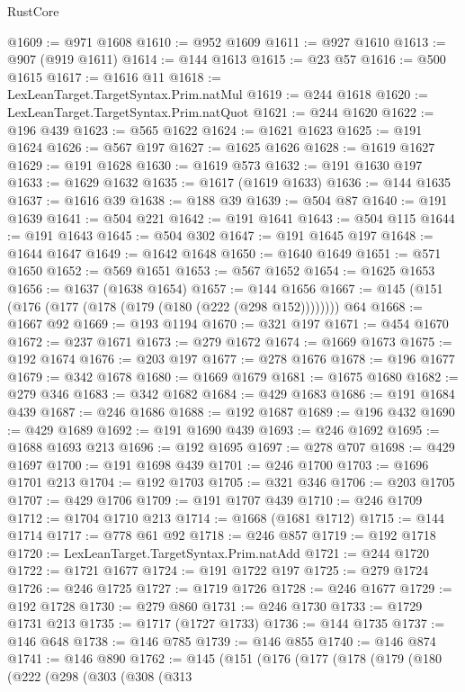 \begin{lexlean}{RustCore}
\begin{coremodule}
@1609 := @971 @1608
@1610 := @952 @1609
@1611 := @927 @1610
@1613 := @907 (@919 @1611)
@1614 := @144 @1613
@1615 := @23 @57
@1616 := @500 @1615
@1617 := @1616 @11
@1618 := LexLeanTarget.TargetSyntax.Prim.natMul
@1619 := @244 @1618
@1620 := LexLeanTarget.TargetSyntax.Prim.natQuot
@1621 := @244 @1620
@1622 := @196 @439
@1623 := @565 @1622
@1624 := @1621 @1623
@1625 := @191 @1624
@1626 := @567 @197
@1627 := @1625 @1626
@1628 := @1619 @1627
@1629 := @191 @1628
@1630 := @1619 @573
@1632 := @191 @1630 @197
@1633 := @1629 @1632
@1635 := @1617 (@1619 @1633)
@1636 := @144 @1635
@1637 := @1616 @39
@1638 := @188 @39
@1639 := @504 @87
@1640 := @191 @1639
@1641 := @504 @221
@1642 := @191 @1641
@1643 := @504 @115
@1644 := @191 @1643
@1645 := @504 @302
@1647 := @191 @1645 @197
@1648 := @1644 @1647
@1649 := @1642 @1648
@1650 := @1640 @1649
@1651 := @571 @1650
@1652 := @569 @1651
@1653 := @567 @1652
@1654 := @1625 @1653
@1656 := @1637 (@1638 @1654)
@1657 := @144 @1656
@1667 := @145 (@151 (@176 (@177 (@178 (@179 (@180 (@222 (@298 @152)))))))) @64
@1668 := @1667 @92
@1669 := @193 @1194
@1670 := @321 @197
@1671 := @454 @1670
@1672 := @237 @1671
@1673 := @279 @1672
@1674 := @1669 @1673
@1675 := @192 @1674
@1676 := @203 @197
@1677 := @278 @1676
@1678 := @196 @1677
@1679 := @342 @1678
@1680 := @1669 @1679
@1681 := @1675 @1680
@1682 := @279 @346
@1683 := @342 @1682
@1684 := @429 @1683
@1686 := @191 @1684 @439
@1687 := @246 @1686
@1688 := @192 @1687
@1689 := @196 @432
@1690 := @429 @1689
@1692 := @191 @1690 @439
@1693 := @246 @1692
@1695 := @1688 @1693 @213
@1696 := @192 @1695
@1697 := @278 @707
@1698 := @429 @1697
@1700 := @191 @1698 @439
@1701 := @246 @1700
@1703 := @1696 @1701 @213
@1704 := @192 @1703
@1705 := @321 @346
@1706 := @203 @1705
@1707 := @429 @1706
@1709 := @191 @1707 @439
@1710 := @246 @1709
@1712 := @1704 @1710 @213
@1714 := @1668 (@1681 @1712)
@1715 := @144 @1714
@1717 := @778 @61 @92
@1718 := @246 @857
@1719 := @192 @1718
@1720 := LexLeanTarget.TargetSyntax.Prim.natAdd
@1721 := @244 @1720
@1722 := @1721 @1677
@1724 := @191 @1722 @197
@1725 := @279 @1724
@1726 := @246 @1725
@1727 := @1719 @1726
@1728 := @246 @1677
@1729 := @192 @1728
@1730 := @279 @860
@1731 := @246 @1730
@1733 := @1729 @1731 @213
@1735 := @1717 (@1727 @1733)
@1736 := @144 @1735
@1737 := @146 @648
@1738 := @146 @785
@1739 := @146 @855
@1740 := @146 @874
@1741 := @146 @890
@1762 := @145
    (@151
      (@176
        (@177
          (@178
            (@179
              (@180
                (@222
                  (@298
                    (@303
                      (@308
                        (@313

\end{coremodule}
\end{lexlean}

